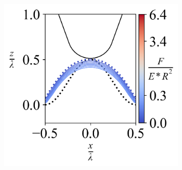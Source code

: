 \begin{figure}[H]
\begin{subfigure}{0.32\textwidth}
    \end{subfigure}   
    \hfill    
    \begin{subfigure}{0.32\textwidth}
        \centering
        \caption{\label{fig: All-Wave-LineContour-5}}
        \includegraphics[width=1\linewidth]{Figures/Wave-LineContour-5.png}
    \end{subfigure}   



    \hfill
    \vspace{-0.3in}
    
    
    

\end{figure}
